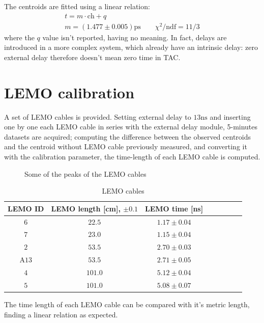 \documentclass[11pt,a4 paper]{article}
\begin{document}
The centroids are fitted using a linear relation:
\begin{gather*}
    t = m\cdot \text{ch} + q \\
    m = (1.477 \pm 0.005) \si{\pico\second} \qquad
    \chi^2/\text{ndf} = 11/3
\end{gather*}
where the $q$ value isn't reported, having no meaning. In fact, delays are introduced in a more complex system, which already have an intrinsic delay: zero external delay therefore doesn't mean zero time in TAC.



\section{LEMO calibration}
A set of LEMO cables is provided. Setting external delay to $13\si{\nano\second}$ and inserting one by one each LEMO cable in series with the external delay module, 5-minutes datasets are acquired; computing the difference between the observed centroids and the centroid without LEMO cable previously measured, and converting it with the calibration parameter, the time-length of each LEMO cable is computed.

\begin{figure}[H]
    \centering
    \caption{Some of the peaks of the LEMO cables}
    \label{fig:lemo}
\end{figure}

\begin{table}[H]
    \centering
    \begin{tabular}{cccccccc}
        \toprule
        LEMO ID & LEMO length [cm], $\pm 0.1$ & LEMO time [ns]\\
        \midrule
        $6$ & $22.5$ & $1.17\pm0.04$\\
        $7$ & $23.0$ & $1.15\pm0.04$\\
        $2$ & $53.5$ & $2.70\pm0.03$\\
        A$13$ & $53.5$ & $2.71\pm0.05$\\
        $4$ & $101.0$ & $5.12\pm0.04$\\
        $5$ & $101.0$ & $5.08\pm0.07$\\
        \bottomrule
    \end{tabular}
    \caption{LEMO cables}
    \label{tab:lemo}
\end{table}

The time length of each LEMO cable can be compared with it's metric length, finding a linear relation as expected.
\end{document}
